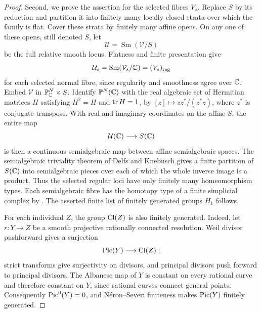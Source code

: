 \begin{proof}
Second, we prove the assertion for the selected fibres $V_s$.  Replace $S$
by its reduction and partition it into finitely many locally closed strata
over which the family is flat.  Cover these strata by finitely many affine
opens.  On any one of these opens, still denoted $S$, let
\[
 \mathcal U=\operatorname{Sm}(\mathcal V/S)
\]
be the full relative smooth locus.  Flatness and finite presentation give
\[
 \mathcal U_s=\operatorname{Sm}(\mathcal V_s/\mathbb C)=(V_s)_{\mathrm{reg}}
\]
for each selected normal fibre, since regularity and smoothness agree over
$\mathbb C$.  Embed $\mathcal V$ in $\mathbb P^N_{\mathbb C}\times S$.  Identify $\mathbb P^N(\mathbb C)$
with the real algebraic set of Hermitian matrices $H$ satisfying $H^2=H$
and $\operatorname{tr} H=1$, by $[z]\mapsto zz^*/(z^*z)$, where $z^*$ is conjugate
transpose.  With real and imaginary coordinates on the affine $S$, the
entire map
\[
 \mathcal U(\mathbb C)\longrightarrow S(\mathbb C)
\]
is then a continuous semialgebraic map between affine semialgebraic spaces.
The semialgebraic triviality theorem of Delfs and Knebusch
\cite[Theorem~6.4]{DelfsKnebusch1982} gives a finite partition of $S(\mathbb C)$
into semialgebraic pieces over each of which the whole inverse image is a
product.  Thus the selected regular loci have only finitely many
homeomorphism types.  Each semialgebraic fibre has the homotopy type of a
finite simplicial complex by
\cite[Theorem~2.1 and Propositions~2.4--2.5]{DelfsKnebusch1982}.
The asserted finite list of finitely generated groups $H_1$ follows.

For each individual $Z$, the group $\operatorname{Cl}(Z)$ is also finitely generated.
Indeed, let $r:Y\to Z$ be a smooth projective rationally connected
resolution.  Weil divisor pushforward gives a surjection
\[
 \operatorname{Pic}(Y)\longrightarrow\operatorname{Cl}(Z):
\]
strict transforms give surjectivity on divisors, and principal divisors
push forward to principal divisors.  The Albanese map of $Y$ is constant
on every rational curve and therefore constant on $Y$, since rational
curves connect general points.  Consequently $\operatorname{Pic}^0(Y)=0$, and
N\'eron--Severi finiteness makes $\operatorname{Pic}(Y)$ finitely generated.


\end{proof}

